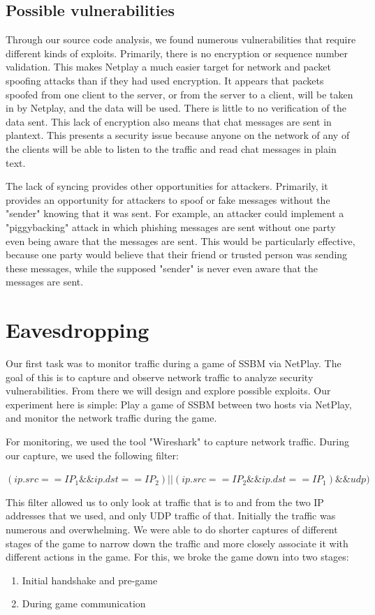 \documentclass[conference]{IEEEtran}
\begin{document}
\subsection{Possible vulnerabilities}
Through our source code analysis, we found numerous vulnerabilities that require different kinds of exploits. 
Primarily, there is no encryption or sequence number validation. 
This makes Netplay a much easier target for network and packet spoofing attacks than if they had used encryption.
It appears that packets spoofed from one client to the server, or from the server to a client, will be taken in by Netplay, and the data will be used.
There is little to no verification of the data sent. 
This lack of encryption also means that chat messages are sent in plantext.
This presents a security issue because anyone on the network of any of the clients will be able to listen to the traffic and read chat messages in plain text.

The lack of syncing provides other opportunities for attackers.
Primarily, it provides an opportunity for attackers to spoof or fake messages without the "sender" knowing that it was sent.
For example, an attacker could implement a "piggybacking" attack in which phishing messages are sent without one party even being aware that the messages are sent.
This would be particularly effective, because one party would believe that their friend or trusted person was sending these messages, while the supposed "sender" is never even aware that the messages are sent.


\section{Eavesdropping}
Our first task was to monitor traffic during a game of SSBM via NetPlay. 
The goal of this is to capture and observe network traffic to analyze security vulnerabilities. 
From there we will design and explore possible exploits.
Our experiment here is simple: Play a game of SSBM between two hosts via NetPlay, and monitor the network traffic during the game.

For monitoring, we used the tool "Wireshark" to capture network traffic. During our capture, we used the following filter:

$ ( ip.src == IP_1 \&\& ip.dst == IP_2 ) || (ip.src == IP_2 \&\& ip.dst == IP_1) \&\& udp) $

\vspace{0.3cm}
This filter allowed us to only look at traffic that is to and from the two IP addresses that we used, and only UDP traffic of that.
Initially the traffic was numerous and overwhelming.
We were able to do shorter captures of different stages of the game to narrow down the traffic and more closely associate it with different actions in the game.
For this, we broke the game down into two stages:
\begin{enumerate}  
\item Initial handshake and pre-game
\item During game communication
\end{enumerate}
\vspace{0.5cm}
\end{document}
